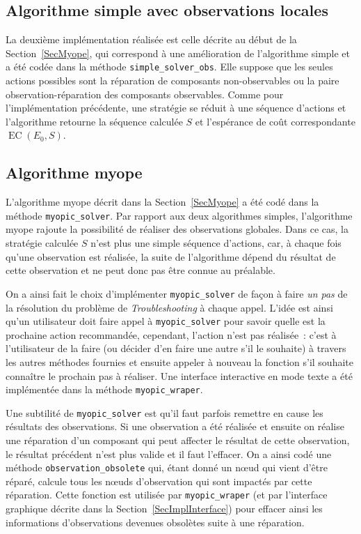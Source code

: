 \documentclass[a4paper,11pt]{article}
\theoremstyle{plain}
\theoremstyle{definition}
\DeclareMathOperator{\EC}{EC}
\begin{document}
\subsection{Algorithme simple avec observations locales}
\label{SecImplAlgoSimpleObs}

La deuxième implémentation réalisée est celle décrite au début de la Section~\ref{SecMyope}, qui correspond à une amélioration de l'algorithme simple et a été codée dans la méthode \texttt{simple\_solver\_\allowbreak{}obs}. Elle suppose que les seules actions possibles sont la réparation de composants non-ob\-ser\-vables ou la paire observation-réparation des composants observables. Comme pour l'implémentation précédente, une stratégie se réduit à une séquence d'actions et l'algorithme retourne la séquence calculée $S$ et l'espérance de coût correspondante $\EC(E_0, S)$.

\subsection{Algorithme myope}
\label{SecImplMyope}

L'algorithme myope décrit dans la Section~\ref{SecMyope} a été codé dans la méthode \texttt{myopic\_solver}. Par rapport aux deux algorithmes simples, l'algorithme myope rajoute la possibilité de réaliser des observations globales. Dans ce cas, la stratégie calculée $S$ n'est plus une simple séquence d'actions, car, à chaque fois qu'une observation est réalisée, la suite de l'algorithme dépend du résultat de cette observation et ne peut donc pas être connue au préalable.

On a ainsi fait le choix d'implémenter \texttt{myopic\_solver} de façon à faire \emph{un pas} de la résolution du problème de \emph{Troubleshooting} à chaque appel. L'idée est ainsi qu'un utilisateur doit faire appel à \texttt{myopic\_solver} pour savoir quelle est la prochaine action recommandée, cependant, l'action n'est pas réalisée~: c'est à l'utilisateur de la faire (ou décider d'en faire une autre s'il le souhaite) à travers les autres méthodes fournies et ensuite appeler à nouveau la fonction s'il souhaite connaître le prochain pas à réaliser. Une interface interactive en mode texte a été implémentée dans la méthode \texttt{myopic\_wraper}.

Une subtilité de \texttt{myopic\_solver} est qu'il faut parfois remettre en cause les résultats des observations. Si une observation a été réalisée et ensuite on réalise une réparation d'un composant qui peut affecter le résultat de cette observation, le résultat précédent n'est plus valide et il faut l'effacer. On a ainsi codé une méthode \texttt{observation\_obsolete} qui, étant donné un nœud qui vient d'être réparé, calcule tous les nœuds d'observation qui sont impactés par cette réparation. Cette fonction est utilisée par \texttt{myopic\_wraper} (et par l'interface graphique décrite dans la Section~\ref{SecImplInterface}) pour effacer ainsi les informations d'observations devenues obsolètes suite à une réparation.
\end{document}
